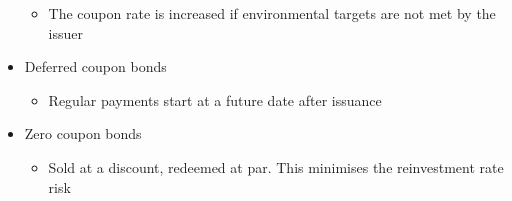 \documentclass[../notes_compiled.tex]{subfiles}
\begin{document}
\begin{itemize}
\begin{itemize}
\item The coupon rate is increased if environmental targets are not met by the issuer
\end{itemize}
\item Deferred coupon bonds
\begin{itemize}
\item Regular payments start at a future date after issuance
\end{itemize}
\item Zero coupon bonds
\begin{itemize}
\item Sold at a discount, redeemed at par. This minimises the reinvestment rate risk
\end{itemize}
\end{itemize}
\end{document}
